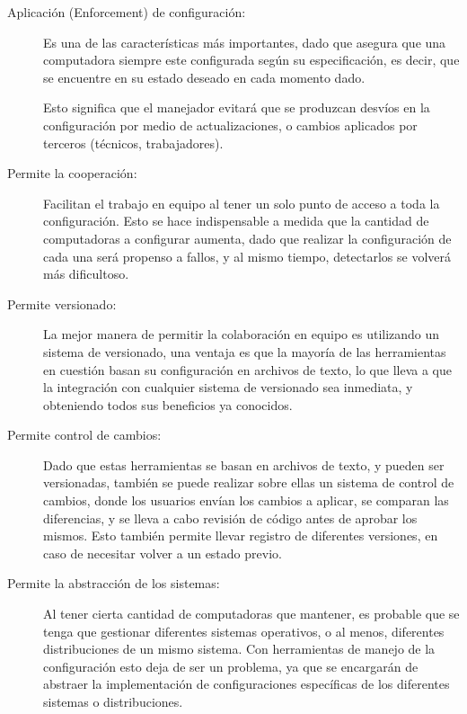 \begin{description}
\item[Aplicación (Enforcement) de configuración:] Es una de las características más importantes, dado que asegura que una computadora siempre este configurada según su especificación, es decir, que se encuentre en su estado deseado en cada momento dado.

Esto significa que el manejador evitará que se produzcan desvíos en la configuración por medio de actualizaciones, o cambios aplicados por terceros (técnicos, trabajadores).

\item[Permite la cooperación:] Facilitan el trabajo en equipo al tener un solo punto de acceso a toda la configuración. 
Esto se hace indispensable a medida que la cantidad de computadoras a configurar aumenta, dado que realizar la configuración de cada una será propenso a fallos, y al mismo tiempo, detectarlos se volverá más dificultoso.

\item[Permite versionado:] La mejor manera de permitir la colaboración en equipo es utilizando un sistema de versionado, una ventaja es que la mayoría de las herramientas en cuestión basan su configuración en archivos de texto, lo que lleva a que la integración con cualquier sistema de versionado sea inmediata, y obteniendo todos sus beneficios ya conocidos.

\item[Permite control de cambios:] Dado que estas herramientas se basan en archivos de texto, y pueden ser versionadas, también se puede realizar sobre ellas un sistema de control de cambios, donde los usuarios envían los cambios a aplicar, se comparan las diferencias, y se lleva a cabo revisión de código antes de aprobar los mismos.
Esto también permite llevar registro de diferentes versiones, en caso de necesitar volver a un estado previo.

\item[Permite la abstracción de los sistemas:] Al tener cierta cantidad de computadoras que mantener, es probable que se tenga que gestionar diferentes sistemas operativos, o al menos, diferentes distribuciones de un mismo sistema. Con herramientas de manejo de la configuración esto deja de ser un problema, ya que se encargarán de abstraer la implementación de configuraciones específicas de los diferentes sistemas o distribuciones.

\end{description}

